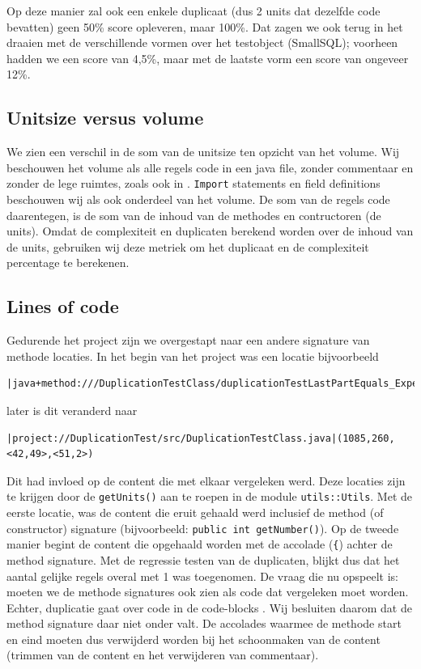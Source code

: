 \documentclass[a4paper]{article}
\begin{document}
Op deze manier zal ook een enkele duplicaat (dus 2 units dat dezelfde code bevatten) geen 50\% score opleveren, maar 100\%. Dat zagen we ook terug in het draaien met de verschillende vormen over het testobject (SmallSQL); voorheen hadden we een score van 4,5\%, maar met de laatste vorm een score van ongeveer 12\%.

\subsection{Unitsize versus volume}
We zien een verschil in de som van de unitsize ten opzicht van het volume. Wij beschouwen het volume als alle regels code in een java file, zonder commentaar en zonder de lege ruimtes, zoals ook in \cite{A}. \texttt{Import} statements en field definitions beschouwen wij als ook onderdeel van het volume. De som van de regels code daarentegen, is de som van de inhoud van de methodes en contructoren (de units). Omdat de complexiteit en duplicaten berekend worden over de inhoud van de units, gebruiken wij deze metriek om het duplicaat en de complexiteit percentage te berekenen.

\subsection{Lines of code}
Gedurende het project zijn we 
overgestapt naar een andere
signature van methode locaties. 
In het begin van het project was
een locatie bijvoorbeeld
\begin{lstlisting}
|java+method:///DuplicationTestClass/duplicationTestLastPartEquals_ExpectTrue()|
\end{lstlisting}
later is dit veranderd naar
\begin{lstlisting}
|project://DuplicationTest/src/DuplicationTestClass.java|(1085,260,<42,49>,<51,2>)
\end{lstlisting}
Dit had invloed op de content die met elkaar vergeleken werd.
Deze locaties zijn te krijgen door de \texttt{getUnits()} aan te
roepen in de module \texttt{utils::Utils}. Met de eerste
locatie, was de content die eruit gehaald werd inclusief de
method (of constructor) signature (bijvoorbeeld: \texttt{public
int getNumber()}). Op de tweede manier begint de content die
opgehaald worden met de accolade (\texttt{\{}) achter de method
signature. Met de regressie testen van de duplicaten, blijkt dus
dat het aantal gelijke regels overal met 1 was toegenomen. De vraag die nu opspeelt is: moeten we de methode signatures ook zien als code dat vergeleken moet worden. Echter, duplicatie gaat over code in de code-blocks \cite{A}. Wij besluiten daarom dat de method signature daar niet onder valt. De accolades waarmee de methode start en eind moeten dus verwijderd worden bij het schoonmaken van de content (trimmen van de content en het verwijderen van commentaar).
\end{document}
